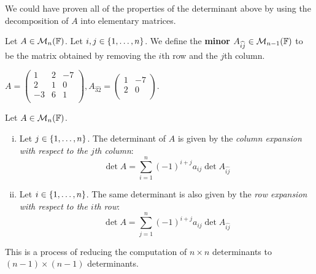 \documentclass[a4paper,11pt]{article}
\begin{document}
\begin{remark}
	We could have proven all of the properties of the determinant above by using the decomposition of $ A $ into elementary matrices.
\end{remark}

\begin{definition}
	Let $ A \in {\mathcal{M}}_n({\mathbb{F}}) $.
	Let $ i, j \in \qty{1, \dots, n} $.
	We define the \textbf{minor} $ A_{\widehat{ij}} \in {\mathcal{M}}_{n-1}({\mathbb{F}}) $ to be the matrix obtained by removing the $ i $th row and the $ j $th column.
\end{definition}

\begin{example}
	$ A = \begin{pmatrix}
		1 & 2 &  -7 \\
		2 & 1 &  0 \\
		-3 & 6 &  1 \\
	\end{pmatrix}, A_{\widehat{32}} = \begin{pmatrix}
		1 &  -7 \\
		2 &  0 \\
	\end{pmatrix} $. 
\end{example}

\begin{lemma}
	Let $ A \in {\mathcal{M}}_n({\mathbb{F}}) $.
	\begin{enumerate}[(i)]
		\item Let $ j \in \qty{1, \dots, n} $.
		      The determinant of $ A $ is given by the \textit{column expansion with respect to the $ j $th column}:
		      \[
			      \det A = \sum_{i=1}^n (-1)^{i+j} a_{ij} \det A_{\widehat{ij}}
		      \]
		\item Let $ i \in \qty{1, \dots, n} $.
		      The same determinant is also given by the \textit{row expansion with respect to the $ i $th row}:
		      \[
			      \det A = \sum_{j=1}^n (-1)^{i+j} a_{ij} \det A_{\widehat{ij}}
		      \]
	\end{enumerate}
	This is a process of reducing the computation of $ n \times n $ determinants to $ (n-1) \times (n-1) $ determinants.
\end{lemma}
\end{document}

